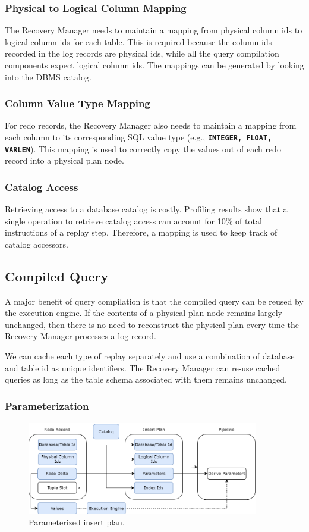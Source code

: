 \documentclass[12pt]{cmuthesis}
\newcommand{\dbSQL}[1]{\texttt{\textbf{#1}}\xspace}
\begin{document}
\subsubsection{Physical to Logical Column Mapping}
The Recovery Manager needs to maintain a mapping from physical column ids to logical column ids for each table. This is required because the column ids recorded in the log records are physical ids, while all the query compilation components expect logical column ids. The mappings can be generated by looking into the DBMS catalog.
\subsubsection{Column Value Type Mapping}
For redo records, the Recovery Manager also needs to maintain a mapping from each column to its corresponding SQL value type (e.g., \dbSQL{INTEGER, FLOAT, VARLEN}). This mapping is used to correctly copy the values out of each redo record into a physical plan node.
\subsubsection{Catalog Access}
Retrieving access to a database catalog is costly. Profiling results show that a single operation to retrieve catalog access can account for 10\% of total instructions of a replay step. Therefore, a mapping is used to keep track of catalog accessors.

\subsection{Compiled Query}
A major benefit of query compilation is that the compiled query can be reused by the execution engine. If the contents of a physical plan node remains largely unchanged, then there is no need to reconstruct the physical plan every time the Recovery Manager processes a log record.

We can cache each type of replay separately and use a combination of database and table id as unique identifiers. The Recovery Manager can re-use cached queries as long as the table schema associated with them remains unchanged.

\subsubsection{Parameterization}
\begin{figure}[t!]
\centering
\includegraphics[width=0.9\textwidth]{images/ParameterizedRedoRecord.png}
\caption{Parameterized insert plan.}
\label{fig:parameterization}
\end{figure}
\end{document}

